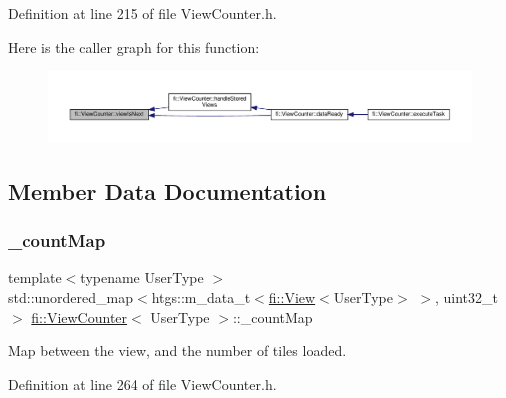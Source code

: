 Definition at line 215 of file View\+Counter.\+h.

Here is the caller graph for this function\+:
\nopagebreak
\begin{figure}[H]
\begin{center}
\leavevmode
\includegraphics[width=350pt]{df/dae/classfi_1_1ViewCounter_a30a0d5ae3d727aea55e70ee4eb45127f_icgraph}
\end{center}
\end{figure}


\subsection{Member Data Documentation}
\mbox{\label{classfi_1_1ViewCounter_ad37ec893e7e014bab185105eaf0ce65a}} 
\subsubsection{\texorpdfstring{\+\_\+count\+Map}{\_countMap}}
{\footnotesize\ttfamily template$<$typename User\+Type $>$ \\
std\+::unordered\+\_\+map$<$htgs\+::m\+\_\+data\+\_\+t$<$\hyperlink{classfi_1_1View}{fi\+::\+View}$<$User\+Type$>$ $>$, uint32\+\_\+t$>$ \hyperlink{classfi_1_1ViewCounter}{fi\+::\+View\+Counter}$<$ User\+Type $>$\+::\+\_\+count\+Map\hspace{0.3cm}{\ttfamily [private]}}



Map between the view, and the number of tiles loaded. 



Definition at line 264 of file View\+Counter.\+h.

\mbox{\label{classfi_1_1ViewCounter_acb9cacb70afa4c4d2de4ad572042b76d}} 
